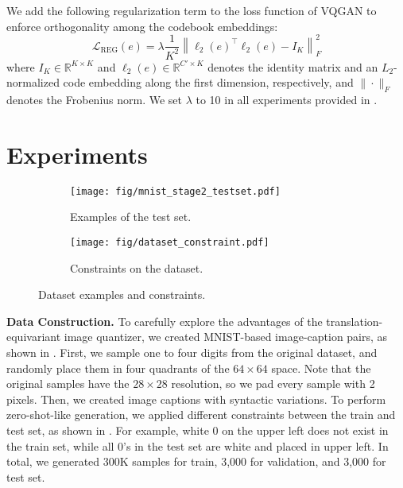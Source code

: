 \documentclass{article}
\newcommand{\wcedit}[1]{\textcolor{blue}{\emph{[Shin: #1]}}}
\begin{document}
We add the following regularization term to the loss function of VQGAN to enforce orthogonality among the codebook embeddings:
\begin{equation}
  \label{eq:our_ortho_term}
  \mathcal{L}_\text{REG}(e) = \lambda \frac{1}{K^2} \left\|\ell_2(e)^{\top} \ell_2(e)-I_{K}\right\|_{F}^{2}
\end{equation}
where $I_{K} \in \mathbb{R}^{K \times K}$ and $\ell_2(e) \in \mathbb{R}^{C' \times K} $ denotes the identity matrix and an $L_2$-normalized code embedding along the first dimension, respectively, and $\| \cdot \|_{F}$ denotes the Frobenius norm.
We set $\lambda$ to 10 in all experiments provided in .



\section{Experiments}
\label{sec:exp}

\begin{figure}
\centering
\begin{subfigure}{0.48\linewidth}
\texttt{[image: fig/mnist\_stage2\_testset.pdf]}
\caption{Examples of the test set.}
\label{fig:mnist_stage2_testset}
\end{subfigure}
\hfill
\begin{subfigure}{0.48\linewidth}
  \texttt{[image: fig/dataset\_constraint.pdf]}
  \caption{Constraints on the dataset.}
  \label{fig:dataset_constraint}
\end{subfigure}
\caption{Dataset examples and constraints.}
\label{fig:dataset}
\end{figure}
 
\noindent \textbf{Data Construction.}
To carefully explore the advantages of the translation-equivariant image quantizer, we created MNIST-based image-caption pairs, as shown in .
First, we sample one to four digits from the original dataset, and randomly place them in four quadrants of the $64 \times 64$ space.
Note that the original samples have the $28 \times 28$ resolution, so we pad every sample with 2 pixels.
Then, we created image captions with syntactic variations.
To perform zero-shot-like generation, we applied different constraints between the train and test set, as shown in .
For example, white 0 on the upper left does not exist in the train set, while all 0's in the test set are white and placed in upper left. 
In total, we generated 300K samples for train, 3,000 for validation, and 3,000 for test set.
\end{document}
